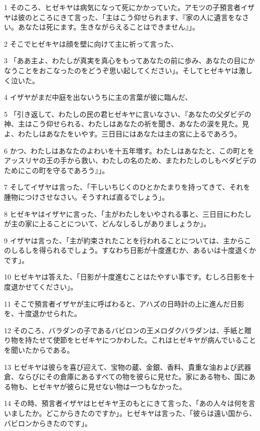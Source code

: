 \par 1 そのころ、ヒゼキヤは病気になって死にかかっていた。アモツの子預言者イザヤは彼のところにきて言った、「主はこう仰せられます、『家の人に遺言をなさい。あなたは死にます。生きながらえることはできません』」。
\par 2 そこでヒゼキヤは顔を壁に向けて主に祈って言った、
\par 3 「ああ主よ、わたしが真実を真心をもってあなたの前に歩み、あなたの目にかなうことをおこなったのをどうぞ思い起してください」。そしてヒゼキヤは激しく泣いた。
\par 4 イザヤがまだ中庭を出ないうちに主の言葉が彼に臨んだ、
\par 5 「引き返して、わたしの民の君ヒゼキヤに言いなさい、『あなたの父ダビデの神、主はこう仰せられる、わたしはあなたの祈を聞き、あなたの涙を見た。見よ、わたしはあなたをいやす。三日目にはあなたは主の宮に上るであろう。
\par 6 かつ、わたしはあなたのよわいを十五年増す。わたしはあなたと、この町とをアッスリヤの王の手から救い、わたしの名のため、またわたしのしもべダビデのためにこの町を守るであろう』」。
\par 7 そしてイザヤは言った、「干しいちじくのひとかたまりを持ってきて、それを腫物につけさせなさい。そうすれば直るでしょう」。
\par 8 ヒゼキヤはイザヤに言った、「主がわたしをいやされる事と、三日目にわたしが主の家に上ることについて、どんなしるしがありましょうか」。
\par 9 イザヤは言った、「主が約束されたことを行われることについては、主からこのしるしを得られるでしょう。すなわち日影が十度進むか、あるいは十度退くかです」。
\par 10 ヒゼキヤは答えた、「日影が十度進むことはたやすい事です。むしろ日影を十度退かせてください」。
\par 11 そこで預言者イザヤが主に呼ばわると、アハズの日時計の上に進んだ日影を、十度退かせられた。
\par 12 そのころ、バラダンの子であるバビロンの王メロダクバラダンは、手紙と贈り物を持たせて使節をヒゼキヤにつかわした。これはヒゼキヤが病んでいることを聞いたからである。
\par 13 ヒゼキヤは彼らを喜び迎えて、宝物の蔵、金銀、香料、貴重な油および武器倉、ならびにその倉庫にあるすべての物を彼らに見せた。家にある物も、国にある物も、ヒゼキヤが彼らに見せない物は一つもなかった。
\par 14 その時、預言者イザヤはヒゼキヤ王のもとにきて言った、「あの人々は何を言いましたか。どこからきたのですか」。ヒゼキヤは言った、「彼らは遠い国から、バビロンからきたのです」。
